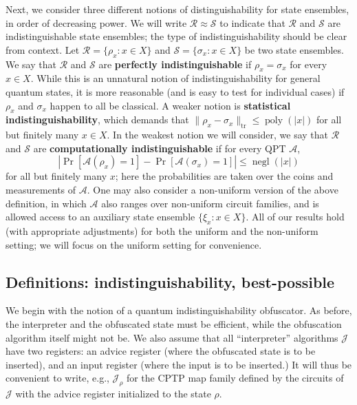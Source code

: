 \documentclass[envcountsame]{llncs}
\numberwithin{equation}{section}
\newcommand{\opn}{\operatorname}
\newcommand{\algo}{\mathcal}
\newcommand{\negl}{\opn{negl}}
\newcommand{\poly}{\opn{poly}}
\begin{document}
Next, we consider three different notions of distinguishability for state ensembles, in order of decreasing power. We will write $\mathcal R \approx \mathcal S$ to indicate that $\mathcal R$ and $\mathcal S$ are indistinguishable state ensembles; the type of indistinguishability should be clear from context. Let $\mathcal R = \{\rho_x : x \in X\}$ and $\mathcal S = \{\sigma_x : x \in X\}$ be two state ensembles. We say that $\mathcal R$ and $\mathcal S$ are \textbf{perfectly indistinguishable} if $\rho_x = \sigma_x$ for every $x \in X$. While this is an unnatural notion of indistinguishability for general quantum states, it is more reasonable (and is easy to test for individual cases) if $\rho_x$ and $\sigma_x$ happen to all be classical. A weaker notion is \textbf{statistical indistinguishability}, which demands that $\|\rho_x - \sigma_x\|_\text{tr} \leq \poly(|x|)$ for all but finitely many $x \in X$. In the weakest notion we will consider, we say that $\mathcal R$ and $\mathcal S$ are \textbf{computationally indistinguishable} if for every QPT $\algo A$,
$$
\left|\Pr[\algo A(\rho_x) = 1] - \Pr[\algo A(\sigma_x) = 1]\right| \leq \negl(|x|)
$$
for all but finitely many $x$; here the probabilities are taken over the coins and measurements of $\algo A$. One may also consider a non-uniform version of the above definition, in which $\algo A$ also ranges over non-uniform circuit families, and is allowed access to an auxiliary state ensemble $\{\xi_x : x \in X\}$. All of our results hold (with appropriate adjustments) for both the uniform and the non-uniform setting; we will focus on the uniform setting for convenience. 

\subsection{Definitions: indistinguishability, best-possible}

We begin with the notion of a quantum indistinguishability obfuscator. As before, the interpreter and the obfuscated state must be efficient, while the obfuscation algorithm itself might not be. We also assume that all ``interpreter'' algorithms $\mathcal J$ have two registers: an advice register (where the obfuscated state is to be inserted), and an input register (where the input is to be inserted.) It will thus be convenient to write, e.g., $\mathcal J_{\rho}$ for the CPTP map family defined by the circuits of $\mathcal J$ with the advice register initialized to the state $\rho$.
\end{document}
